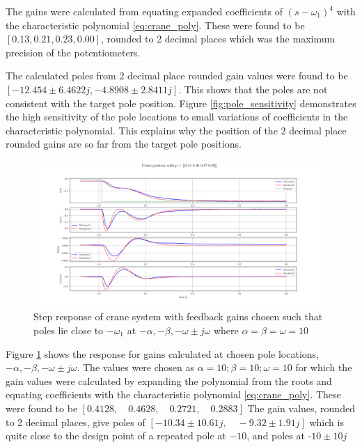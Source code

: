 \documentclass{article}
\begin{document}
The gains were calculated from equating expanded coefficients of $(s - \omega_1)^4$ with the characteristic polynomial \ref{eq:crane_poly}.
These were found to be $[ 0.13,  0.21,  0.23, 0.00 ]$, rounded to 2 decimal places which was the maximum precision of the potentiometers.

The calculated poles from 2 decimal place rounded gain values were found to be $[-12.454 \pm 6.4622j, -4.8908 \pm 2.8411j]$.
This shows that the poles are not consistent with the target pole position.
Figure \ref{fig:pole_sensitivity} demonstrates the high sensitivity of the pole locations to small variations of coefficients in the characteristic polynomial.
This explains why the position of the 2 decimal place rounded gains are so far from the target pole positions.

\begin{figure}[H]
  \centering
  \includegraphics[width=0.99\textwidth]{figures/3.4b.png}
  \caption{Step response of crane system with feedback gains chosen such that poles lie close to $-\omega_1$ at $-\alpha, -\beta, -\omega \pm j\omega$ where $\alpha = \beta = \omega = 10$}
  \label{fig:exp3.4b}
\end{figure}

Figure \ref{fig:exp3.4b} shows the response for gains calculated at chosen pole locations, $-\alpha, -\beta, -\omega \pm j\omega$.
The values were chosen as $\alpha = 10; \beta= 10; \omega = 10$ for which the gain values were calculated by expanding the polynomial from the roots and equating
coefficients with the characteristic polynomial \ref{eq:crane_poly}.
These were found to be $[0.4128, \quad 0.4628, \quad 0.2721, \quad 0.2883]$
The gain values, rounded to 2 decimal places, give poles of $[-10.34 \pm 10.61j, \quad -9.32 \pm 1.91j]$ 
which is quite close to the design point of a repeated pole at $-10$, and poles at -$10\pm 10j$
\end{document}
